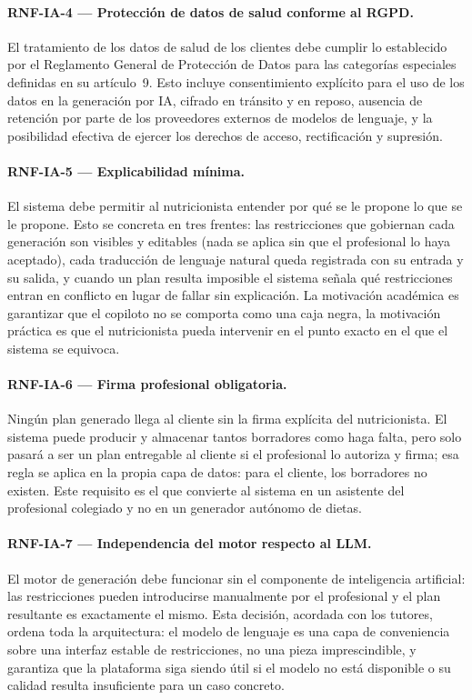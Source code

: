 \paragraph{RNF-IA-4 --- Protección de datos de salud conforme al RGPD.}
El tratamiento de los datos de salud de los clientes debe cumplir lo establecido por el Reglamento General de Protección de Datos para las categorías especiales definidas en su artículo~9. Esto incluye consentimiento explícito para el uso de los datos en la generación por IA, cifrado en tránsito y en reposo, ausencia de retención por parte de los proveedores externos de modelos de lenguaje, y la posibilidad efectiva de ejercer los derechos de acceso, rectificación y supresión.

\paragraph{RNF-IA-5 --- Explicabilidad mínima.}
El sistema debe permitir al nutricionista entender por qué se le propone lo que se le propone. Esto se concreta en tres frentes: las restricciones que gobiernan cada generación son visibles y editables (nada se aplica sin que el profesional lo haya aceptado), cada traducción de lenguaje natural queda registrada con su entrada y su salida, y cuando un plan resulta imposible el sistema señala qué restricciones entran en conflicto en lugar de fallar sin explicación. La motivación académica es garantizar que el copiloto no se comporta como una caja negra, la motivación práctica es que el nutricionista pueda intervenir en el punto exacto en el que el sistema se equivoca.

\paragraph{RNF-IA-6 --- Firma profesional obligatoria.}
Ningún plan generado llega al cliente sin la firma explícita del nutricionista. El sistema puede producir y almacenar tantos borradores como haga falta, pero solo pasará a ser un plan entregable al cliente si el profesional lo autoriza y firma; esa regla se aplica en la propia capa de datos: para el cliente, los borradores no existen. Este requisito es el que convierte al sistema en un asistente del profesional colegiado y no en un generador autónomo de dietas.

\paragraph{RNF-IA-7 --- Independencia del motor respecto al LLM.}
El motor de generación debe funcionar sin el componente de inteligencia artificial: las restricciones pueden introducirse manualmente por el profesional y el plan resultante es exactamente el mismo. Esta decisión, acordada con los tutores, ordena toda la arquitectura: el modelo de lenguaje es una capa de conveniencia sobre una interfaz estable de restricciones, no una pieza imprescindible, y garantiza que la plataforma siga siendo útil si el modelo no está disponible o su calidad resulta insuficiente para un caso concreto.

